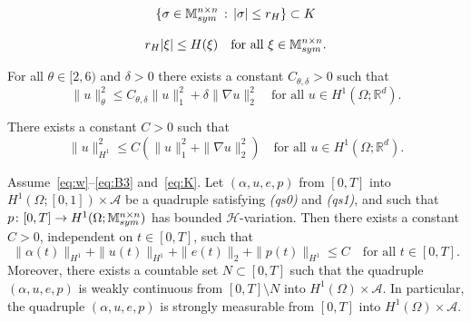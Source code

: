 \documentclass[10pt,a4paper]{amsart}
\def\M {\mathbb M^{n\times n}_{\rm sym}}
\def\R {\mathbb R}
\begin{document}
\begin{equation}\label{eq:K}
\{\sigma\in\M\,:\,|\sigma|\le r_H\}\subset K
\end{equation}

\begin{equation}\label{eq:rH}
r_H|\xi|\le H(\xi)\quad\text{for all $\xi\in\M$}.
\end{equation}

\begin{lemma}\label{lem:Cdelta}
For all $\theta\in[2,6)$ and $\delta>0$ there exists a constant $C_{\theta,\delta}>0$ such that
\begin{equation*}
\|u\|_\theta^2\le C_{\theta,\delta}\|u\|_1^2+\delta\|\nabla u\|_2^2\quad\text{for all $u\in H^1(\Omega;\R^d)$}.
\end{equation*}
\end{lemma}

\begin{corollary}\label{coro:H1norm}
There exists a constant $C>0$ such that
\begin{equation}\label{eq:H1norm}
\|u\|_{H^1}^2\le C\left(\|u\|_1^2+\|\nabla u\|_2^2\right)\quad\text{for all $u\in H^1(\Omega;\R^d)$}.
\end{equation}
\end{corollary}

\begin{lemma}\label{lem:measurability}
Assume~\eqref{eq:w}--\eqref{eq:B3} and~\eqref{eq:K}. Let $(\alpha,u,e,p)$ from $[0,T]$ into $H^1(\Omega;[0,1])\times\mathcal A$ be a quadruple satisfying {\em (qs0)} and {\em (qs1)}, and such that $p\colon [0,T]\to H^1(\Omega;\M)$ has bounded $\mathcal H$-variation. Then there exists a constant $C>0$, independent on $t\in[0,T]$, such that
\begin{equation}\label{eq:unif_bound}
\|\alpha(t)\|_{H^1}+\|u(t)\|_{H^1}+\|e(t)\|_2+\|p(t)\|_{H^1}\le C\quad\text{for all $t\in[0,T]$}.
\end{equation}
Moreover, there exists a countable set $N\subset [0,T]$ such that the quadruple $(\alpha,u,e,p)$ is weakly continuous from $[0,T]\setminus N$ into $H^1(\Omega)\times \mathcal A$. In particular, the quadruple $(\alpha,u,e,p)$ is strongly measurable from $[0,T]$ into $H^1(\Omega)\times \mathcal A$.
\end{lemma}
\end{document}
